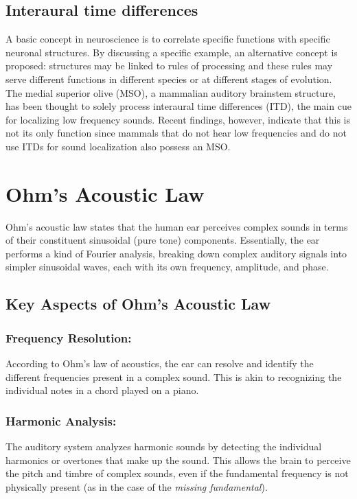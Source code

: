 \documentclass{article}
\begin{document}
\subsection{Interaural time differences}

A basic concept in neuroscience is to correlate specific functions with specific neuronal structures. By discussing a specific example, an alternative concept is proposed: structures may be linked to rules of processing and these rules may serve different functions in different species or at different stages of evolution. The medial superior olive (MSO), a mammalian auditory brainstem structure, has been thought to solely process interaural time differences (ITD), the main cue for localizing low frequency sounds. Recent findings, however, indicate that this is not its only function since mammals that do not hear low frequencies and do not use ITDs for sound localization also possess an MSO.


\section{Ohm’s Acoustic Law}
Ohm's acoustic law states that the human ear perceives complex sounds in terms of their constituent sinusoidal (pure tone) components. Essentially, the ear performs a kind of Fourier analysis, breaking down complex auditory signals into simpler sinusoidal waves, each with its own frequency, amplitude, and phase.

\subsection{Key Aspects of Ohm's Acoustic Law}

\subsubsection{Frequency Resolution:}
According to Ohm's law of acoustics, the ear can resolve and identify the different frequencies present in a complex sound. This is akin to recognizing the individual notes in a chord played on a piano.

\subsubsection{Harmonic Analysis:}
The auditory system analyzes harmonic sounds by detecting the individual harmonics or overtones that make up the sound. This allows the brain to perceive the pitch and timbre of complex sounds, even if the fundamental frequency is not physically present (as in the case of the \textit{missing fundamental}).
\end{document}
